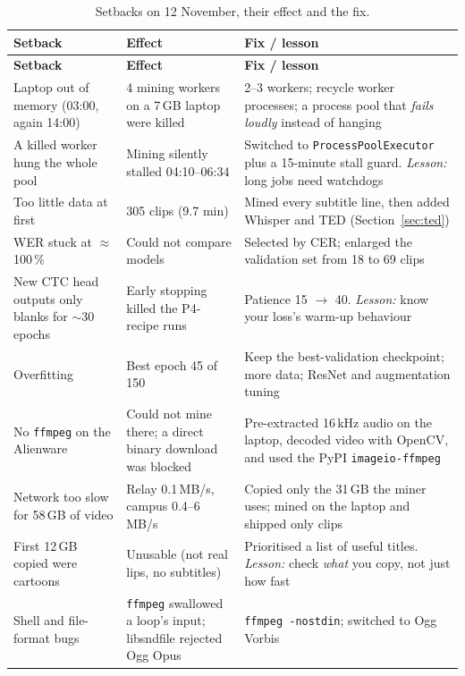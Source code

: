 \documentclass[11pt,a4paper]{article}
\newcommand{\code}[1]{\texttt{\small #1}}
\begin{document}
{\small
{}
\begin{longtable}{@{}L{3.3cm}L{4.0cm}L{6.9cm}@{}}
\caption{Setbacks on 12 November, their effect and the fix.}\label{tab:setbacks}\\
\toprule
{}\sffamily\bfseries Setback & \sffamily\bfseries Effect & \sffamily\bfseries Fix / lesson \\
\midrule
\endfirsthead
\toprule
{}\sffamily\bfseries Setback & \sffamily\bfseries Effect & \sffamily\bfseries Fix / lesson \\
\midrule
\endhead
Laptop out of memory (03:00, again 14:00) & 4 mining workers on a 7\,GB laptop were killed & 2--3 workers; recycle worker processes; a process pool that \emph{fails loudly} instead of hanging \\
A killed worker hung the whole pool & Mining silently stalled 04:10--06:34 & Switched to \code{ProcessPoolExecutor} plus a 15-minute stall guard. \emph{Lesson:} long jobs need watchdogs \\
Too little data at first & 305 clips (9.7 min) & Mined every subtitle line, then added Whisper and TED (Section~\ref{sec:ted}) \\
WER stuck at $\approx$100\,\% & Could not compare models & Selected by CER; enlarged the validation set from 18 to 69 clips \\
New CTC head outputs only blanks for $\sim$30 epochs & Early stopping killed the P4-recipe runs & Patience 15 $\rightarrow$ 40. \emph{Lesson:} know your loss's warm-up behaviour \\
Overfitting & Best epoch 45 of 150 & Keep the best-validation checkpoint; more data; ResNet and augmentation tuning \\
No \code{ffmpeg} on the Alienware & Could not mine there; a direct binary download was blocked & Pre-extracted 16\,kHz audio on the laptop, decoded video with OpenCV, and used the PyPI \code{imageio-ffmpeg} \\
Network too slow for 58\,GB of video & Relay 0.1\,MB/s, campus 0.4--6\,MB/s & Copied only the 31\,GB the miner uses; mined on the laptop and shipped only clips \\
First 12\,GB copied were cartoons & Unusable (not real lips, no subtitles) & Prioritised a list of useful titles. \emph{Lesson:} check \emph{what} you copy, not just how fast \\
Shell and file-format bugs & \code{ffmpeg} swallowed a loop's input; libsndfile rejected Ogg Opus & \code{ffmpeg -nostdin}; switched to Ogg Vorbis \\

\end{longtable}}
\end{document}
